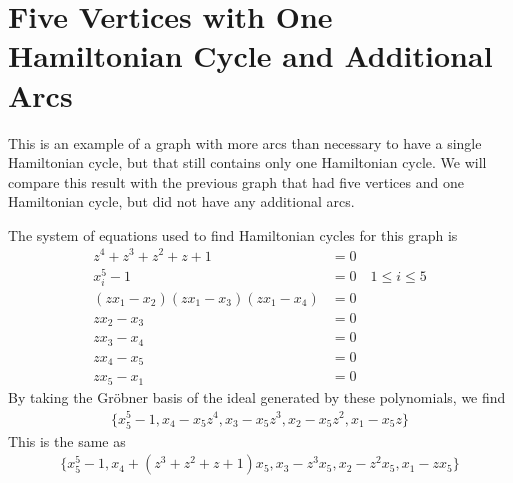 \documentclass[letterpaper]{article}
\newcommand{\aln}[1]{\begin{align*} #1 \end{align*}} %
\begin{document}
\section{Five Vertices with One Hamiltonian Cycle and Additional Arcs}
This is an example of a graph with more arcs than necessary to have a single Hamiltonian cycle, but that still contains only one Hamiltonian cycle. We will compare this result with the previous graph that had five vertices and one Hamiltonian cycle, but did not have any additional arcs.
\begin{center}
\end{center}
The system of equations used to find Hamiltonian cycles for this graph is
\aln{
  z^4 + z^3 + z^2 + z + 1 &= 0\\
  x_i^5 - 1 &= 0 \quad 1 \leq i \leq 5\\
  (z x_1 - x_2)(z x_1 - x_3)(z x_1 - x_4) &= 0\\
  z x_2 - x_3 &= 0\\
  z x_3 - x_4 &= 0\\
  z x_4 - x_5 &= 0\\
  z x_5 - x_1 &= 0
}
By taking the Gr\"obner basis of the ideal generated by these polynomials, we find
\aln{
  \{x_5^5-1, x_4-x_5z^4, x_3-x_5z^3, x_2-x_5z^2, x_1-x_5z\}
}
This is the same as
\aln{
  \{x_5^5-1, x_4+(z^3+z^2+z+1)x_5, x_3-z^3x_5, x_2-z^2x_5, x_1-zx_5\}
}

\newpage
\end{document}
